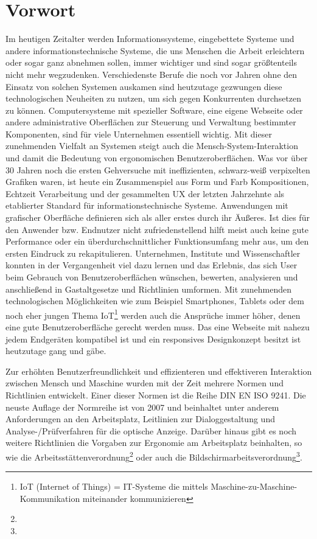 \section{Vorwort}
\label{sec:vorwort}

Im heutigen Zeitalter werden Informationssysteme, eingebettete Systeme und andere informationstechnische Systeme, die uns Menschen die Arbeit erleichtern oder sogar ganz abnehmen sollen, immer wichtiger und sind sogar größtenteils nicht mehr wegzudenken. Verschiedenste Berufe die noch vor Jahren ohne den Einsatz von solchen Systemen auskamen sind heutzutage gezwungen diese technologischen Neuheiten zu nutzen, um sich gegen Konkurrenten durchsetzen zu können. Computersysteme mit spezieller Software, eine eigene Webseite oder andere administrative Oberflächen zur Steuerung und Verwaltung bestimmter Komponenten, sind für viele Unternehmen essentiell wichtig. Mit dieser zunehmenden Vielfalt an Systemen steigt auch die Mensch-System-Interaktion und damit die Bedeutung von ergonomischen Benutzeroberflächen. Was vor über 30 Jahren noch die ersten Gehversuche mit ineffizienten, schwarz-weiß verpixelten Grafiken waren, ist heute ein Zusammenspiel aus Form und Farb Kompositionen, Echtzeit Verarbeitung und der gesammelten UX der letzten Jahrzehnte als etablierter Standard für informationstechnische Systeme. Anwendungen mit grafischer Oberfläche definieren sich als aller erstes durch ihr Äußeres. Ist dies für den Anwender bzw. Endnutzer nicht zufriedenstellend hilft meist auch keine gute Performance oder ein überdurchschnittlicher Funktionsumfang mehr aus, um den ersten Eindruck zu rekapitulieren. Unternehmen, Institute und Wissenschaftler konnten in der Vergangenheit viel dazu lernen und das Erlebnis, das sich User beim Gebrauch von Benutzeroberflächen wünschen, bewerten, analysieren und anschließend in Gastaltgesetze und Richtlinien umformen. Mit zunehmenden technologischen Möglichkeiten wie zum Beispiel Smartphones, Tablets oder dem noch eher jungen Thema IoT\footnote{IoT (Internet of Things) = IT-Systeme die mittels Maschine-zu-Maschine-Kommunikation miteinander kommunizieren} werden auch die Ansprüche immer höher, denen eine gute Benutzeroberfläche gerecht werden muss. Das eine Webseite mit nahezu jedem Endgeräten kompatibel ist und ein responsives Designkonzept besitzt ist heutzutage gang und gäbe.

Zur erhöhten Benutzerfreundlichkeit und effizienteren und effektiveren Interaktion zwischen Mensch und Maschine wurden mit der Zeit mehrere Normen und Richtlinien entwickelt. Einer dieser Normen ist die Reihe DIN EN ISO 9241. Die neuste Auflage der Normreihe ist von 2007 und beinhaltet unter anderem Anforderungen an den Arbeitsplatz, Leitlinien zur Dialoggestaltung und Analyse-/Prüfverfahren für die optische Anzeige. Darüber hinaus gibt es noch weitere Richtlinien die Vorgaben zur Ergonomie am Arbeitsplatz beinhalten, so wie die Arbeitsstättenverordnung\footnote{} oder auch die Bildschirmarbeitsverordnung\footnote{}.

